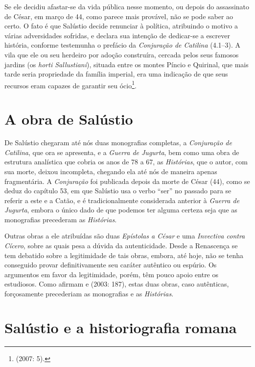 Se ele decidiu afastar-se da vida pública nesse momento, ou depois do
assassinato de César, em março de 44, como parece mais provável, não se pode
saber ao certo. O fato é que Salústio decide renunciar à política, atribuindo o
motivo a várias adversidades sofridas, e declara sua intenção de dedicar-se a
escrever história, conforme testemunha o prefácio da \emph{Conjuração de
Catilina} (4.1--3). A vila que ele ou seu herdeiro por adoção construíra,
cercada pelos seus famosos jardins (os \emph{horti Sallustiani}), situada entre
os montes Píncio e Quirinal, que mais tarde seria propriedade da família
imperial, era uma indicação de que seus recursos eram capazes de garantir seu
ócio\footnote{  (2007: 5).}. 


\section{A obra de Salústio}

De Salústio chegaram até nós duas monografias completas, a \emph{Conjuração de
Catilina}, que ora se apresenta, e a \emph{Guerra de Jugurta}, bem como uma
obra de estrutura analística que
cobria os anos de 78 a 67, as \emph{Histórias}, que o autor, com sua
morte, deixou incompleta, chegando ela até nós de maneira apenas fragmentária.
A \emph{Conjuração} foi publicada depois da morte de César (44), como se
deduz do capítulo 53, em que Salústio usa o verbo “ser” no passado para se
referir a este e a Catão, e é tradicionalmente considerada anterior à
\emph{Guerra de Jugurta}, embora o único dado de que podemos ter alguma certeza
seja que as monografias precederam as \emph{Histórias}. 

Outras obras a ele atribuídas são duas \emph{Epístolas a César} e uma
\emph{Invectiva contra Cícero}, sobre as quais pesa a dúvida da autenticidade.
Desde a Renascença se tem debatido sobre a legitimidade de tais obras, embora,
até hoje, não se tenha conseguido provar definitivamente seu caráter autêntico
ou espúrio. Os argumentos em favor da legitimidade, porém, têm pouco apoio
entre os estudiosos. Como afirmam  e  (2003: 187), estas duas obras,
caso autênticas, forçosamente precederiam as monografias e as \emph{Histórias}. 

\section{Salústio e a historiografia romana}

